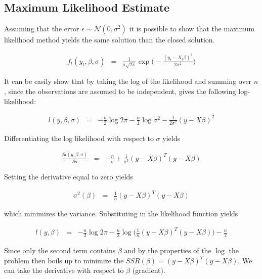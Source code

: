 \documentclass[conference]{IEEEtran}\usepackage[]{graphicx}\usepackage[]{color}
\begin{document}
\subsection{Maximum Likelihood Estimate}

Assuming that the error $\epsilon \sim \mathcal{N}(0, \sigma^2)$ it is possible
to show that the maximum likelihood method yields the same solution than the
closed solution.

\begin{eqnarray*}
  f_t(y_t, \beta, \sigma) &=& \frac{1}{\sigma \sqrt{2 \pi}} \exp \Bigg(-
                              \frac{(y_t-X_t \beta)^2}{2 \sigma^2} \Bigg)
\end{eqnarray*}

It can be easily show that by taking the log of the likelihood and summing over
$n$, since the observations are assumed to be independent, gives the following
log-likelihood: 

\begin{eqnarray*}
  l(y, \beta, \sigma) &=& -\frac{n}{2} \log 2 \pi - \frac{n}{2} \log \sigma^2
                            - \frac{1}{2 \sigma^2} (y - X \beta)^2
\end{eqnarray*}

Differentiating the log likelihood with respect to $\sigma$ yields

\begin{eqnarray*}
  \frac{\partial l(y, \beta, \sigma)}{\partial \sigma} &=& - \frac{n}{\sigma} +
                                                           \frac{1}{\sigma^3}
                                                           (y-X\beta)^T(y - X \beta)
\end{eqnarray*}

Setting the derivative equal to zero yields

\begin{eqnarray*}
  \sigma^2(\beta) &=& \frac{1}{n}(y-X \beta)^T(y-X \beta)
\end{eqnarray*}

which minimizes the variance. Substituting in the likelihood function yields

\begin{eqnarray*}
  l(y, \beta) &=& -\frac{n}{2} \log 2 \pi - \frac{n}{2} \log
                  \Big(\frac{1}{n}(y-X \beta)^T (y-X \beta) \Big) - \frac{n}{2}
\end{eqnarray*}

Since only the second term contains $\beta$ and by the properties of the $\log$
the problem then boils up to minimize the $SSR(\beta) = (y-X \beta)^T (y-X
\beta)$. We can take the derivative with respect to $\beta$ (gradient).
\end{document}
